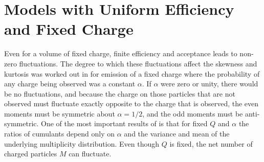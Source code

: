 
\section{Models with Uniform Efficiency and Fixed Charge}\label{sec:uniformeff}

Even for a volume of fixed charge, finite efficiency and acceptance leads to non-zero fluctuations. The degree to which these fluctuations affect the skewness and kurtosis was worked out in \cite{Savchuk:2019xfg} for emission of a fixed charge where the probability of any charge being observed was a constant $\alpha$. If $\alpha$ were zero or unity, there would be no fluctuations, and because the charge on those particles that are not observed must fluctuate exactly opposite to the charge that is observed, the even moments must be symmetric about $\alpha=1/2$, and the odd moments must be anti-symmetric. One of the most important results of \cite{Savchuk:2019xfg} is that for fixed $Q$ and $\alpha$ the ratios of cumulants depend only on $\alpha$ and the variance and mean of the underlying multiplicity distribution. Even though $Q$ is fixed, the net number of charged particles $M$ can fluctuate. 

